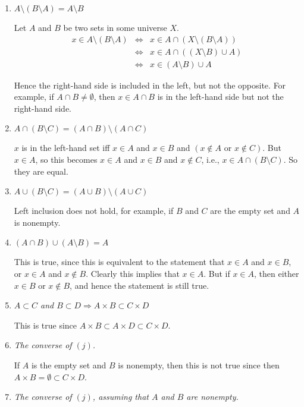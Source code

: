 \documentclass[letterpaper, 11pt]{article}
\begin{document}
\begin{enumerate}
\begin{enumerate}
\item \emph{$A \setminus (B \setminus A) = A \setminus B$}

Let $A$ and $B$ be two sets in some universe $X$.
\begin{eqnarray*}
x \in A \setminus (B \setminus A) &\Leftrightarrow& x \in A \cap (X \setminus (B \setminus A)) \\
&\Leftrightarrow& x \in A \cap ((X \setminus B) \cup A) \\
&\Leftrightarrow& x \in (A \setminus B) \cup A
\end{eqnarray*}

Hence the right-hand side is included in the left, but not the opposite.  For example, if $A \cap B \neq \emptyset$, then $x \in A \cap B$ is in the left-hand side but not the right-hand side.

\item \emph{$A \cap (B \setminus C) = (A \cap B) \setminus (A \cap C)$}

$x$ is in the left-hand set iff $x \in A$ and $x \in B$ and $(x \notin A \mbox{ or } x \notin C)$.  But $x \in A$, so this becomes $x \in A$ and $x \in B$ and $x \notin C$, i.e., $x \in A\cap(B \setminus C)$.  So they are equal.

\item \emph{$A \cup (B \setminus C) = (A \cup B) \setminus (A \cup C)$}

Left inclusion does not hold, for example, if $B$ and $C$ are the empty set and $A$ is nonempty.  
\item \emph{$(A \cap B) \cup (A \setminus B) = A$}

This is true, since this is equivalent to the statement that $x \in A$ and $x \in B$, or $x \in A$ and $x \notin B$.  Clearly this implies that $x \in A$.  But if $x \in A$, then either $x \in B$ or $x \notin B$, and hence the statement is still true.

\item \emph{$A \subset C$ and $B \subset D \Rightarrow A \times B \subset C \times D$}

This is true since $A \times B \subset A \times D \subset C \times D$.

\item \emph{The converse of $(j)$.}

If $A$ is the empty set and $B$ is nonempty, then this is not true since then $A \times B = \emptyset \subset C \times D$.

\item \emph{The converse of $(j)$, assuming that $A$ and $B$ are nonempty.}


\end{enumerate}
\end{enumerate}
\end{document}
